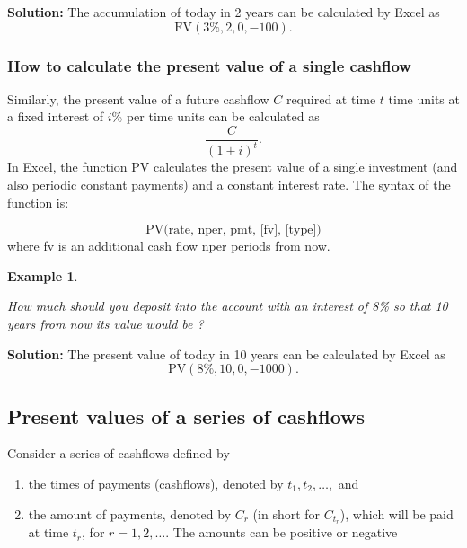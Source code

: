 \documentclass[
]{article}
\theoremstyle{definition}
\theoremstyle{definition}
\newtheorem{example}{Example}[section]
\theoremstyle{definition}
\theoremstyle{definition}
\theoremstyle{remark}
\begin{document}
\textbf{Solution:} The accumulation of today in 2 years can be calculated by Excel as
\[\text{FV}(3\%, 2, 0, -100).\]

\hypertarget{how-to-calculate-the-present-value-of-a-single-cashflow}{%
\subsubsection{How to calculate the present value of a single cashflow}\label{how-to-calculate-the-present-value-of-a-single-cashflow}}

Similarly, the present value of a future cashflow \(C\) required at time
\(t\) time units at a fixed interest of \(i\)\% per time units can be
calculated as \[\frac{C}{(1+i)^t}.\] In Excel, the function PV
calculates the present value of a single investment (and also periodic
constant payments) and a constant interest rate. The syntax of the
function is:

\[\text{PV(rate, nper, pmt, [fv], [type])}\] where fv is an additional
cash flow nper periods from now.

\begin{example}
\protect\hypertarget{exm:unlabeled-div-4}{}\label{exm:unlabeled-div-4}

\emph{How much should you deposit into the account with an
interest of 8\% so that 10 years from now its value would be ?}

\end{example}

\textbf{Solution:}
The present value of today in 10 years can be calculated by Excel as
\[\text{PV}(8\%, 10, 0, -1000).\]

\hypertarget{present-values-of-a-series-of-cashflows}{%
\subsection{Present values of a series of cashflows}\label{present-values-of-a-series-of-cashflows}}

Consider a series of cashflows defined by

\begin{enumerate}
\def\labelenumi{\arabic{enumi}.}
\item
  the times of payments (cashflows), denoted by \(t_1, t_2, \ldots,\)
  and
\item
  the amount of payments, denoted by \(C_{r}\) (in short for \(C_{t_r}\)),
  which will be paid at time \(t_r\), for \(r = 1,2, \ldots\). The amounts
  can be positive or negative
\end{enumerate}
\end{document}
